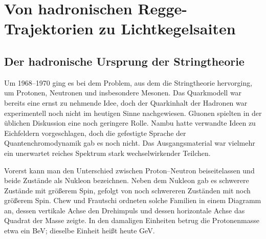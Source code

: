 \chapter{Von hadronischen Regge-Trajektorien zu Lichtkegelsaiten}


\section{Der hadronische Ursprung der Stringtheorie}

Um 1968--1970 ging es bei dem Problem, aus dem die Stringtheorie hervorging, um Protonen, Neutronen und insbesondere Mesonen. Das Quarkmodell war bereits eine ernst zu nehmende Idee, doch der Quarkinhalt der Hadronen war experimentell noch nicht im heutigen Sinne nachgewiesen. Gluonen spielten in der üblichen Diskussion eine noch geringere Rolle. Nambu hatte verwandte Ideen zu Eichfeldern vorgeschlagen, doch die gefestigte Sprache der Quantenchromodynamik gab es noch nicht. Das Ausgangsmaterial war vielmehr ein unerwartet reiches Spektrum stark wechselwirkender Teilchen.

Vorerst kann man den Unterschied zwischen Proton--Neutron beiseitelassen und beide Zustände als Nukleon bezeichnen. Neben dem Nukleon gab es schwerere Zustände mit größerem Spin, gefolgt von noch schwereren Zuständen mit noch größerem Spin. Chew und Frautschi ordneten solche Familien in einem Diagramm an, dessen vertikale Achse den Drehimpuls und dessen horizontale Achse das Quadrat der Masse zeigte. In den damaligen Einheiten betrug die Protonenmasse etwa ein BeV; dieselbe Einheit heißt heute GeV.

